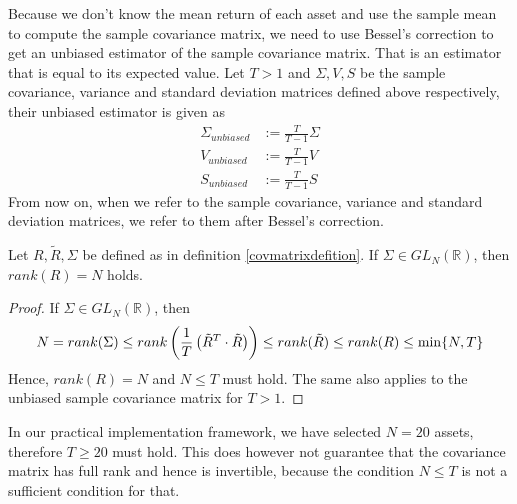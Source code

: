         \begin{remark}
            Because we don't know the mean return of each asset and use the sample mean to compute the sample covariance matrix, we need to use Bessel's correction to get an unbiased estimator of the sample covariance matrix. That is an estimator that is equal to its expected value. Let $T > 1$ and $\Sigma, V, S$ be the sample covariance, variance and standard deviation matrices defined above respectively, their unbiased estimator is given as
            \begin{align*}
                \Sigma_{unbiased} &:= \frac{T}{T-1} \Sigma \\
                V_{unbiased} &:= \frac{T}{T-1} V \\
                S_{unbiased} &:= \frac{T}{T-1} S
            \end{align*}
            From now on, when we refer to the sample covariance, variance and standard deviation matrices, we refer to them after Bessel's correction.
        \end{remark}
        
        \begin{theorem}
            Let $R, \tilde{R}, \Sigma$ be defined as in definition \ref{covmatrixdefition}. If $\Sigma \in GL_N(\mathbb{R})$, then $rank(R) = N$ holds.
        \end{theorem}
        
        \begin{proof}
            If $\Sigma \in GL_N(\mathbb{R})$, then
            \begin{align*}
                N = rank(\Sigma) \leq rank \left( \frac{1}{T} \left( \Tilde{R}^T \cdot \Tilde{R} \right) \right) \leq rank(\Tilde{R}) \leq rank(R) \leq \min \{ N, T \}
            \end{align*}
            Hence, $rank(R) = N$ and $N \leq T$ must hold. The same also applies to the unbiased sample covariance matrix for $T > 1$.
        \end{proof}
        
        In our practical implementation framework, we have selected $N = 20$ assets, therefore $T \geq 20$ must hold. This does however not guarantee that the covariance matrix has full rank and hence is invertible, because the condition $N \leq T$ is not a sufficient condition for that.
		
